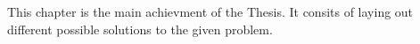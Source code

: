 This chapter is the main achievment of the Thesis. It consits of laying out different possible solutions to the given problem.